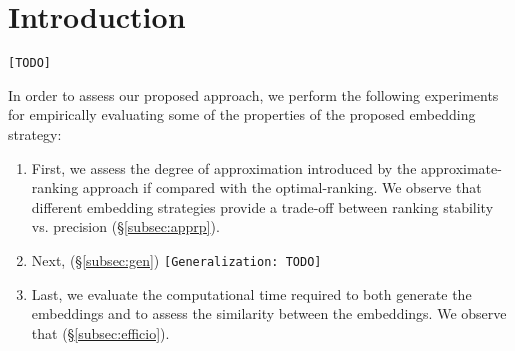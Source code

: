 \section{Introduction}

\texttt{[TODO]}

In order to assess our proposed approach, we perform the following experiments for empirically evaluating some of the properties of the proposed embedding strategy:
\begin{enumerate}
	\item First, we assess the degree of approximation introduced by the approximate-ranking approach if compared with the optimal-ranking. We observe that different embedding strategies provide a trade-off between ranking stability vs. precision (\S\ref{subsec:apprp}).
	\item Next, (\S\ref{subsec:gen}) \texttt{[Generalization: TODO]}
	\item Last, we evaluate the computational time required to both generate the embeddings and to assess the similarity between the embeddings. We observe that (\S\ref{subsec:efficio}).
\end{enumerate}